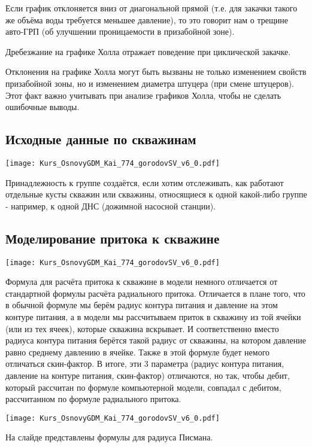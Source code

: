 \documentclass[main.tex]{subfiles}
\begin{document}
Если график отклоняется вниз от диагональной прямой (т.е. для закачки такого же объёма воды требуется меньшее давление), то это говорит нам о трещине  авто-ГРП (об улучшении проницаемости в призабойной зоне).

Дребезжание на графике Холла отражает поведение при циклической закачке.

Отклонения на графике Холла могут быть вызваны не только изменением свойств призабойной зоны, но и изменением диаметра штуцера (при смене штуцеров).
Этот факт важно учитывать при анализе графиков Холла, чтобы не сделать ошибочные выводы. 

\subsection{Исходные данные по скважинам}

\texttt{[image: Kurs\_OsnovyGDM\_Kai\_774\_gorodovSV\_v6\_0.pdf]}

Принадлежность к группе создаётся, если хотим отслеживать, как работают отдельные кусты скважин или скважины, относящиеся к одной какой-либо группе - например, к одной ДНС (дожимной насосной станции).

\subsection{Моделирование притока к скважине}

\texttt{[image: Kurs\_OsnovyGDM\_Kai\_774\_gorodovSV\_v6\_0.pdf]}

Формула для расчёта притока к скважине в модели немного отличается от стандартной формулы расчёта радиального притока.
Отличается в плане того, что в обычной формуле мы берём радиус контура питания и давление на этом контуре питания, а в модели мы рассчитываем приток в скважину из той ячейки (или из тех ячеек), которые скважина вскрывает.
И соответственно вместо радиуса контура питания берётся такой радиус от скважины, на котором давление равно среднему давлению в ячейке.
Также в этой формуле будет немого отличаться скин-фактор.
В итоге, эти 3 параметра (радиус контура питания, давление на контуре питания, скин-фактор) отличаются, но так, чтобы дебит, который рассчитан по формуле компьютерной модели, совпадал с дебитом, рассчитанном по формуле радиального притока.

\texttt{[image: Kurs\_OsnovyGDM\_Kai\_774\_gorodovSV\_v6\_0.pdf]}

На слайде представлены формулы для радиуса Писмана.
\\
\end{document}
